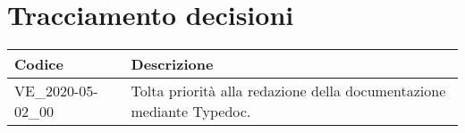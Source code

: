 \section{Tracciamento decisioni}
\renewcommand{\arraystretch}{1.8}

\begin{longtable}{|p{5cm}|p{8cm}|}
	\hline
	
	\rowcolor{header}
	\textbf{Codice} & \textbf{Descrizione} \\
	
	\hline
	
	VE\_2020-05-02\_00 & Tolta priorità alla redazione della documentazione mediante Typedoc.\\
	\hline
\end{longtable}